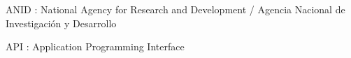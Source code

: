 \documentclass[english, 12pt]{report}
\begin{document}





















 ANID : National Agency for Research and Development / Agencia Nacional de Investigación y Desarrollo
 
 API : Application Programming Interface
 
 


\cleardoublepage



\end{document}
